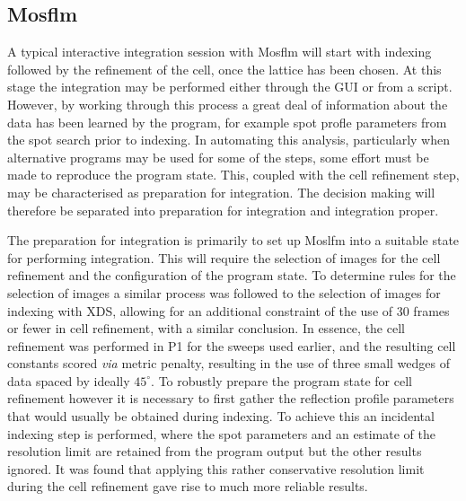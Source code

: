\documentclass[preprint,pdf]{iucr}
\begin{document}
\subsection{Mosflm}

A typical interactive integration session with Mosflm will start with
indexing followed by the refinement of the cell, once the lattice has
been chosen. At this stage the integration may be performed either
through the GUI or from a script. However, by working through this
process a great deal of information about the data has been learned by
the program, for example spot profle parameters from the spot search
prior to indexing. In automating this analysis, particularly when
alternative programs may be used for some of the steps, some effort
must be made to reproduce the program state. This, coupled with the
cell refinement step, may be characterised as preparation for
integration. The decision making will therefore be separated into
preparation for integration and integration proper.

The preparation for integration is primarily to set up Moslfm into
a suitable state for performing integration. This will require the
selection of images for the cell refinement and
the configuration of the program state. To determine rules for the
selection of images a similar process was followed to the selection of
images for indexing with XDS, allowing for an additional constraint of
the use of 30 frames or fewer in cell refinement, with a similar
conclusion. In essence, the cell refinement was performed in P1 for the
sweeps used earlier, and the resulting cell constants scored
\emph{via} metric penalty, resulting in the use of three small wedges
of data spaced by ideally $45^{\circ}$. To robustly prepare the program state
for cell refinement however it is necessary to first gather the
reflection profile parameters that would usually be obtained during
indexing. To achieve this an incidental indexing step is
performed, where the spot parameters and an estimate of the resolution
limit are retained from the program output
but the other results ignored. It was found that
applying this rather conservative
resolution limit during the cell refinement gave rise to
much more reliable results.
\end{document}
